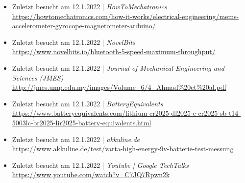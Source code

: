 \begin{itemize}
    \item Zuletzt besucht am 12.1.2022 | \textit{HowToMechatronics}\\
        \url{https://howtomechatronics.com/how-it-works/electrical-engineering/mems-accelerometer-gyrocope-magnetometer-arduino/}
    \item Zuletzt besucht am 12.1.2022 | \textit{NovelBits} \\
        \url{https://www.novelbits.io/bluetooth-5-speed-maximum-throughput/}
    \item Zuletzt besucht am 12.1.2022 | \textit{Journal of Mechanical Engineering and Sciences (JMES)} \\
        \url{http://jmes.ump.edu.my/images/Volume_6/4_Ahmad%20et%20al.pdf}
    \item Zuletzt besucht am 12.1.2022 | \textit{BatteryEquivalents}\\
        \url{https://www.batteryequivalents.com/lithium-cr2025-dl2025-e-cr2025-sb-t14-5003lc-br2025-lir2025-battery-equivalents.html}
    \item Zuletzt besucht am 12.1.2022 | \textit{akkuline.de}\\
        \url{https://www.akkuline.de/test/varta-high-energy-9v-batterie-test-messung}
    \item Zuletzt besucht am 12.1.2022 | \textit{Youtube | Google TechTalks} \\
        \url{https://www.youtube.com/watch?v=C7JQ7Rpwn2k}
\end{itemize}
